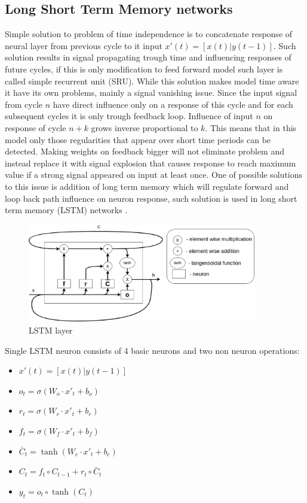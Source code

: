\documentclass{kybernetika}
\begin{document}
\subsection{Long Short Term Memory networks}
Simple solution to problem of time independence is to concatenate response of neural layer
from previous cycle to it input $x'(t)=[x(t)|y(t-1)]$.
Such solution results in signal propagating trough time and influencing responses of future cycles,
if this is only modification to feed forward model such layer is called simple recurrent
unit (SRU).
While this solution makes model time aware it have its own problems, mainly a signal vanishing
issue. Since the input signal from cycle $n$ have direct influence only on a response of this
cycle and for each subsequent cycles it is only trough feedback loop. Influence of input $n$ on
response of cycle $n+k$ grows inverse proportional to $k$.
This means that in this model only those regularities that appear over short time periods can
be detected.
Making weights on feedback bigger will not eliminate problem and instead replace it with signal
explosion that causes response to reach maximum value if a strong signal appeared on input at
least once.
One of possible solutions to this issue is addition of long term memory which will regulate
forward and loop back path influence on neuron response, such solution is used in long short
term memory (LSTM) networks \cite{Hochreiter1997}.
\begin{figure}[ht] 
\centering
	\includegraphics[width=10cm]{figures/lstm}
\caption{LSTM layer}
\label{fig:lstm}
\end{figure}
Single LSTM neuron consists of 4 basic neurons and two non neuron operations:
\begin{itemize}
\item $x'(t)=[x(t)|y(t-1)]$
\item $o_t=\sigma (W_o\cdot x'_t+b_o)$
\item $r_t=\sigma (W_r\cdot x'_t+b_r)$
\item $f_t=\sigma (W_f\cdot x'_t+b_f)$
\item $\bar{C}_t=\tanh (W_c\cdot x'_t+b_c)$
\item $C_t=f_t\circ C_{t-1}+r_t\circ \bar{C}_t$
\item $y_t=o_t\circ \tanh (C_t)$
\end{itemize}
\end{document}
